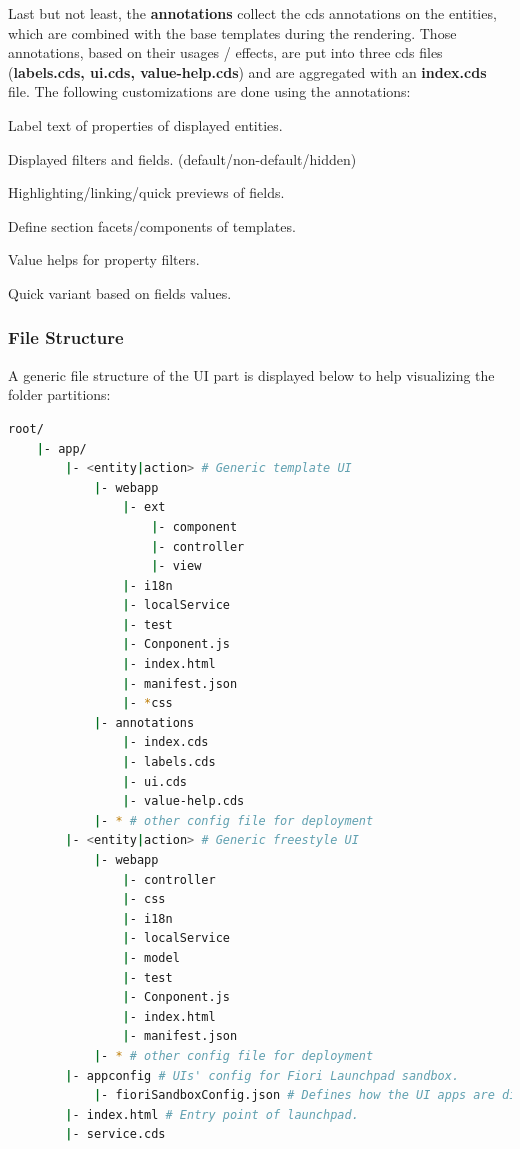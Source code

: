 Last but not least, the \textbf{annotations} collect the cds annotations on the entities, which are combined with the base templates during the rendering.
Those annotations, based on their usages / effects, are put into three cds files (\textbf{labels.cds, ui.cds, value-help.cds}) and are aggregated with an \textbf{index.cds} file.
The following customizations are done using the annotations:

\begin{compactenum}
    \item Label text of properties of displayed entities.
    \item Displayed filters and fields. (default/non-default/hidden)
    \item Highlighting/linking/quick previews of fields.
    \item Define section facets/components of templates.
    \item Value helps for property filters.
    \item Quick variant based on fields values.
\end{compactenum}

\subsubsection{File Structure}

A generic file structure of the UI part is displayed below to help visualizing the folder partitions: 

\begin{lstlisting}[language={bash}]
root/
    |- app/
        |- <entity|action> # Generic template UI
            |- webapp
                |- ext
                    |- component 
                    |- controller
                    |- view
                |- i18n
                |- localService
                |- test
                |- Conponent.js
                |- index.html
                |- manifest.json
                |- *css 
            |- annotations
                |- index.cds
                |- labels.cds
                |- ui.cds
                |- value-help.cds
            |- * # other config file for deployment
        |- <entity|action> # Generic freestyle UI
            |- webapp
                |- controller
                |- css
                |- i18n
                |- localService
                |- model
                |- test
                |- Conponent.js
                |- index.html
                |- manifest.json
            |- * # other config file for deployment
        |- appconfig # UIs' config for Fiori Launchpad sandbox.
            |- fioriSandboxConfig.json # Defines how the UI apps are dispalyed and navigated.
        |- index.html # Entry point of launchpad.
        |- service.cds
\end{lstlisting}


